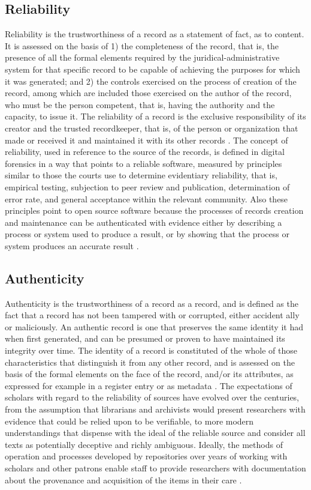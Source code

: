 \subsection{Reliability}
Reliability is the trustworthiness of a record as a statement of fact, as to content. It is assessed on the basis of 1) the completeness of the record, that is, the presence of all the formal elements required by the juridical-administrative system for that specific record to be capable of achieving the purposes for which it was generated; and 2) the controls exercised on the process of creation of the record, among which are included those exercised on the author of the record, who must be the person competent, that is, having the authority and the capacity, to issue it. The reliability of a record is the exclusive responsibility of its creator and the trusted recordkeeper, that is, of the person or organization that made or received it and maintained it with its other records \cite[52]{duranti2009digital}.
The concept of reliability, used in reference to the source of the records, is defined in digital forensics in a way that points to a reliable software, measured by principles similar to those the courts use to determine evidentiary reliability, that is, empirical testing, subjection to peer review and publication, determination of error rate, and general acceptance within the relevant community. Also these principles point to open source software because the processes of records creation and maintenance can be authenticated with evidence either by describing a process or system used to produce a result, or by showing that the process or system produces an accurate result \cite[59]{duranti2009digital}.

\subsection{Authenticity}
Authenticity is the trustworthiness of a record as a record, and is defined as the fact that a record has not been tampered with or corrupted, either accident ally or maliciously. An authentic record is one that preserves the same identity it had when first generated, and can be presumed or proven to have maintained its integrity over time. The identity of a record is constituted of the whole of those characteristics that distinguish it from any other record, and is assessed on the basis of the formal elements on the face of the record, and/or its attributes, as expressed for example in a register entry or as metadata \cite[52]{duranti2009digital}.
The expectations of scholars with regard to the reliability of sources have evolved over the centuries, from the assumption that librarians and archivists would present researchers with evidence that could be relied upon to be verifiable, to more modern understandings that dispense with the ideal of the reliable source and consider all texts as potentially deceptive and richly ambiguous. Ideally, the methods of operation and processes developed by repositories over years of working with scholars and other patrons enable staff to provide researchers with documentation about the provenance and acquisition of the items in their care \cite[32]{kirschenbaum2010digital}.

